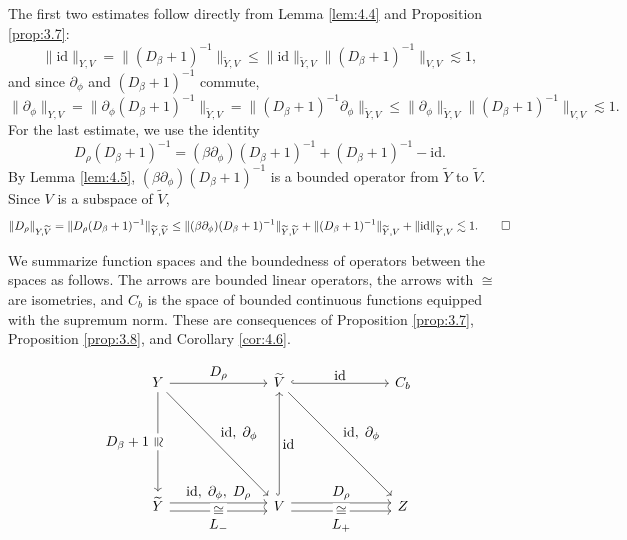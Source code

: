 \documentclass[11pt]{article}
\makeatletter
\renewenvironment{proof}[1][\proofname]{\par
  \vspace{-.7\topsep}%
  \pushQED{\qed}%
  \normalfont
  \topsep0pt \partopsep0pt %
  \trivlist
  \item[\hskip\labelsep
        \itshape
    #1\@addpunct{.}]\ignorespaces
}{%
  \popQED\endtrivlist\@endpefalse
  \addvspace{6pt plus 6pt} %
}
\theoremstyle{definition}
\theoremstyle{remark}
\numberwithin{equation}{section}
\renewcommand{\tilde}{\widetilde}
\newcommand{\del}{\partial}
\newcommand{\norm}[1]{\lVert #1 \rVert}
\makeatother
\begin{document}
\begin{proof}
The first two estimates follow directly from Lemma \ref{lem:4.4} and Proposition \ref{prop:3.7}:
\[\norm{\text{id}}_{Y, V} = \norm{(D_\beta + 1)^{-1}}_{\tilde{Y}, V} \leq \norm{\text{id}}_{\tilde{Y}, V} \norm{(D_\beta + 1)^{-1}}_{V,V} \lesssim 1,\]
and since $\del_\phi$ and $(D_\beta + 1)^{-1}$ commute,
\[\norm{\del_\phi}_{Y, V} = \norm{\del_\phi (D_\beta + 1)^{-1}}_{\tilde{Y},V} = \norm{(D_\beta + 1)^{-1} \del_\phi}_{\tilde{Y},V} \leq \norm{\del_\phi}_{\tilde{Y}, V} \norm{(D_\beta + 1)^{-1}}_{V,V} \lesssim 1.\]
For the last estimate, we use the identity
\[D_\rho (D_\beta + 1)^{-1} = (\beta \del_\phi) (D_\beta + 1)^{-1} + (D_\beta + 1)^{-1} - \text{id}.\]
By Lemma \ref{lem:4.5}, $(\beta\del_\phi)(D_\beta + 1)^{-1}$ is a bounded operator from $\tilde{Y}$ to $\tilde{V}$. Since $V$ is a subspace of $\tilde{V}$,
\[\norm{D_\rho}_{Y, \tilde{V}} = \norm{D_\rho (D_\beta + 1)^{-1}}_{\tilde{Y}, \tilde{V}} \leq \norm{(\beta\del_\phi) (D_\beta + 1)^{-1}}_{\tilde{Y}, \tilde{V}} + \norm{(D_\beta + 1)^{-1}}_{\tilde{Y},V} + \norm{\text{id}}_{\tilde{Y},V} \lesssim 1. \qedhere \]
\end{proof}

We summarize function spaces and the boundedness of operators between the spaces as follows. The arrows are bounded linear operators, the arrows with $\cong$ are isometries, and $C_b$ is the space of bounded continuous functions equipped with the supremum norm. These are consequences of Proposition \ref{prop:3.7}, Proposition \ref{prop:3.8}, and Corollary \ref{cor:4.6}.

\begin{equation} \label{eq:4.10}
\begin{tikzcd}[row sep=7em, column sep=7em, every label/.append style={font=\normalsize}]
Y
	\arrow{dr}{\text{id},\;\del_\phi}
	\arrow{d}[xshift=-9.2ex, yshift=-.2ex]{D_{\beta}+1}[sloped, description]{\cong}
	\arrow{r}{D_\rho}
& \tilde{V} 
	\arrow{dr}{\text{id},\;\del_\phi}
	\arrow[hook]{r}{\text{id}}
& C_b \\
\tilde{Y}
	\arrow[shift left=1.2]{r}{\text{id},\;\del_\phi,\;D_\rho}
	\arrow[shift right=1.2]{r}[yshift=-4ex]{L_{-}}[description]{\cong}
& V
	\arrow[hook]{u}[right]{\text{id}}
	\arrow[shift left=1.2]{r}{D_\rho}
	\arrow[shift right=1.2]{r}[yshift=-4ex]{L_+}[description]{\cong}
& Z 
\end{tikzcd}
\end{equation}
\end{document}
